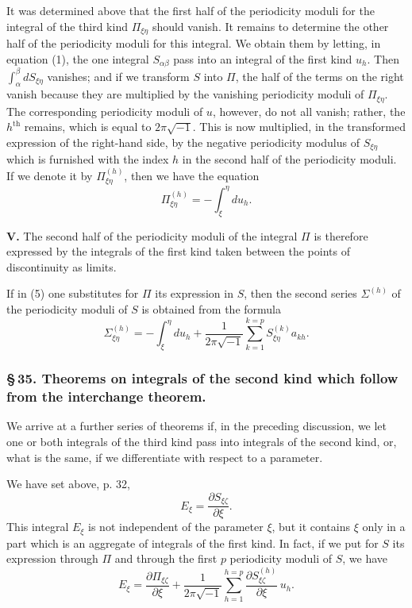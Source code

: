 \documentclass[10pt]{article}
\begin{document}
It was determined above that the first half of the periodicity moduli for the integral of the third kind \(\Pi_{\xi\eta}\) should vanish. It remains to determine the other half of the periodicity moduli for this integral. We obtain them by letting, in equation (1), the one integral \(S_{\alpha\beta}\) pass into an integral of the first kind \(u_h\). Then \(\int_{\alpha}^{\beta}dS_{\xi\eta}\) vanishes; and if we transform \(S\) into \(\Pi\), the half of the terms on the right vanish because they are multiplied by the vanishing periodicity moduli of \(\Pi_{\xi\eta}\). The corresponding periodicity moduli of \(u\), however, do not all vanish; rather, the \(h^{\mathrm{th}}\) remains, which is equal to \(2\pi\sqrt{-1}\). This is now multiplied, in the transformed expression of the right-hand side, by the negative periodicity modulus of \(S_{\xi\eta}\) which is furnished with the index \(h\) in the second half of the periodicity moduli. If we denote it by \(\Pi_{\xi\eta}^{(h)}\), then we have the equation
\[
\tag{6}
\Pi_{\xi\eta}^{(h)}=-\int_{\xi}^{\eta}du_h.
\]

\noindent\textbf{V.} The second half of the periodicity moduli of the integral \(\Pi\) is therefore expressed by the integrals of the first kind taken between the points of discontinuity as limits.

If in (5) one substitutes for \(\Pi\) its expression in \(S\), then the second series \(\Sigma^{(h)}\) of the periodicity moduli of \(S\) is obtained from the formula
\[
\tag{7}
\Sigma_{\xi\eta}^{(h)}=-\int_{\xi}^{\eta}du_h+\frac{1}{2\pi\sqrt{-1}}\sum_{k=1}^{k=p}S_{\xi\eta}^{(k)}a_{kh}.
\]

\subsubsection*{\S\,35. Theorems on integrals of the second kind which follow from the interchange theorem.}

We arrive at a further series of theorems if, in the preceding discussion, we let one or both integrals of the third kind pass into integrals of the second kind, or, what is the same, if we differentiate with respect to a parameter.

We have set above, p. 32,
\[
E_\xi=\frac{\partial S_{\xi\zeta}}{\partial \xi}.
\]
This integral \(E_\xi\) is not independent of the parameter \(\xi\), but it contains \(\xi\) only in a part which is an aggregate of integrals of the first kind. In fact, if we put for \(S\) its expression through \(\Pi\) and through the first \(p\) periodicity moduli of \(S\), we have
\[
\tag{8}
E_\xi=\frac{\partial \Pi_{\xi\zeta}}{\partial \xi}
+\frac{1}{2\pi\sqrt{-1}}\sum_{h=1}^{h=p}
\frac{\partial S_{\xi\zeta}^{(h)}}{\partial \xi}\,u_h.
\]
\end{document}
